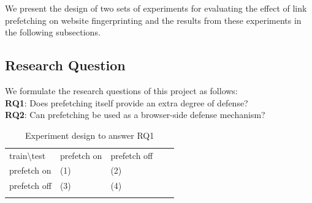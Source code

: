 We present the design of two sets of experiments for evaluating the effect of link
prefetching on website fingerprinting and the results from these
experiments in the following subsections.
\subsection{Research Question}

We formulate the research questions of this project as follows:\\
{\bf RQ1}: Does prefetching itself provide an extra degree of defense?\\
{\bf RQ2}: Can prefetching be used as a browser-side defense
mechanism?\\



\begin{table}[]
\centering
\caption{Experiment design to answer RQ1}
\label{table:prefetch}
\begin{tabular}{lllll}
\cline{1-3}
\multicolumn{1}{|l|}{train\textbackslash test} & \multicolumn{1}{l|}{prefetch on} & \multicolumn{1}{l|}{prefetch off} &  &  \\ \cline{1-3}
\multicolumn{1}{|l|}{prefetch on}                    & \multicolumn{1}{l|}{(1)}         & \multicolumn{1}{l|}{(2)}          &  &  \\ \cline{1-3}
\multicolumn{1}{|l|}{prefetch off}                   & \multicolumn{1}{l|}{(3)}         & \multicolumn{1}{l|}{(4)}          &  &  \\ \cline{1-3}
                                                     &                                  &                                   &  & 
\end{tabular}                  
\end{table}

